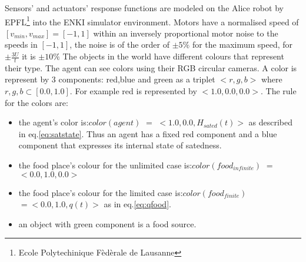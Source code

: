 Sensors' and actuators' response functions are modeled on the Alice robot by
EPFL\footnote{Ecole Polytechinique Fèdèrale de Lausanne} into the ENKI simulator environment.
Motors have a normalised speed of $[v_{min},v_{max}]=[-1,1] $ within an inversely
proportional motor noise to the speeds in $[-1,1] $, the noise is of the order
of $\pm 5\%$ for the maximum speed, for $\pm \frac{3 U}{t}$ it is $\pm 10\%$
The objects in the world have different colours that represent their type.
The agent can see colors using their RGB circular cameras.
A color is represent by 3 components: red,blue and green as a triplet $<r,g,b>$
where $r,g,b \subset [0.0,1.0]$. For example red is represented by $<1.0,0.0,0.0>$.
The rule for the colors are:
\begin{itemize}
 \item the agent's color is:$color(agent)$ $=$ $<1.0,0.0,H_{sated}(t)>$ as described in eq.\ref{eq:satstate}.
Thus an agent has a fixed red component and a blue component that expresses its internal state of satedness.
\item the food place's colour for the unlimited case is:$color(food_{infinite})$ $=$ $<0.0,1.0,0.0>$
\item the food place's colour for the limited case is:$color(food_{finite})$ $=<0.0,1.0,q(t)>$ as in eq.\ref{eq:qfood}.
\item an object with green component is a food source.
\end{itemize}

